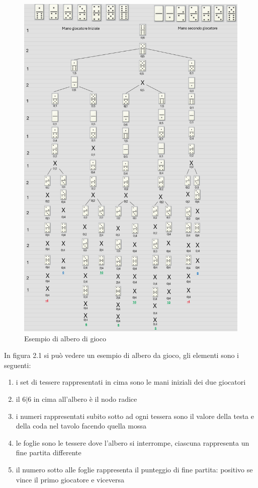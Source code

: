 \documentclass[a4paper,12pt]{report}
\begin{document}
\begin{figure}[h!]
    \centering
    \includegraphics[width=1\textwidth]{imgs/partita_completa.png} 
    \caption{Esempio di albero di gioco}
    \label{fig:etichetta}
\end{figure}

In figura 2.1 si può vedere un esempio di albero da gioco, gli elementi sono i seguenti:

\begin{enumerate}
    \item i set di tessere rappresentati in cima sono le mani iniziali dei due giocatori
    \item il \(6|6\) in cima all'albero è il nodo radice
    \item i numeri rappresentati subito sotto ad ogni tessera sono il valore della testa e della coda nel tavolo facendo quella mossa
    \item le foglie sono le tessere dove l'albero si interrompe, ciascuna rappresenta un fine partita differente
    \item il numero sotto alle foglie rappresenta il punteggio di fine partita: positivo se vince il primo giocatore e viceversa  
\end{enumerate}
\end{document}
